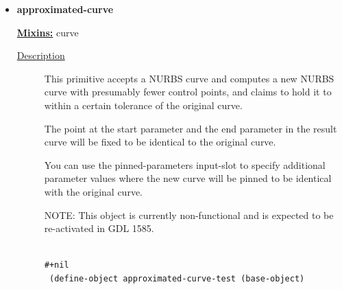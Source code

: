 \documentclass [11pt]{book}
\begin{document}
\begin{itemize}
\begin{description}
\end{description}







\item {}
\label{prim:approximated-curve}
\textbf{approximated-curve}


\textbf{
\underline{Mixins:}} curve





\begin{description}

\item [
\underline{Description}]


This primitive accepts a NURBS curve and 
computes a new NURBS curve with presumably fewer control points, and claims
to hold it to within a certain tolerance of the original curve. 

The point at the start parameter and the end parameter in the result 
curve will be fixed to be identical to the original curve. 

You can use the pinned-parameters input-slot to specify additional parameter
values where the new curve will be pinned to be identical with the original curve.

NOTE: This object is currently non-functional and is expected to be
re-activated in GDL 1585.





\end{description}




\begin{figure}
\begin{lrbox}{\boxedverb}
\begin{minipage}{\linewidth}
{\small

\begin{verbatim}

#+nil
 (define-object approximated-curve-test (base-object)
  

\end{verbatim}}
\end{minipage}
\end{lrbox}
\end{figure}
\end{itemize}
\end{document}
